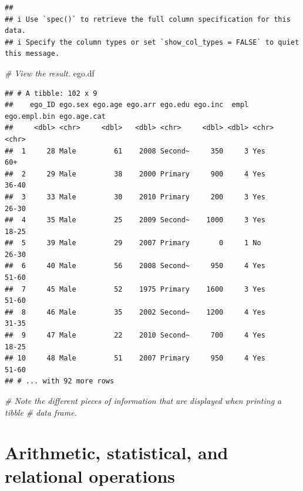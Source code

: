 \documentclass[
]{book}
\newenvironment{Shaded}{\begin{snugshade}}{\end{snugshade}}
\newcommand{\CommentTok}[1]{\textcolor[rgb]{0.56,0.35,0.01}{\textit{#1}}}
\newcommand{\NormalTok}[1]{#1}
\begin{document}
\begin{verbatim}
## 
## i Use `spec()` to retrieve the full column specification for this data.
## i Specify the column types or set `show_col_types = FALSE` to quiet this message.
\end{verbatim}

\begin{Shaded}
\begin{Highlighting}[]
\CommentTok{\# View the result.}
\NormalTok{ego.df}
\end{Highlighting}
\end{Shaded}

\begin{verbatim}
## # A tibble: 102 x 9
##    ego_ID ego.sex ego.age ego.arr ego.edu ego.inc  empl ego.empl.bin ego.age.cat
##     <dbl> <chr>     <dbl>   <dbl> <chr>     <dbl> <dbl> <chr>        <chr>      
##  1     28 Male         61    2008 Second~     350     3 Yes          60+        
##  2     29 Male         38    2000 Primary     900     4 Yes          36-40      
##  3     33 Male         30    2010 Primary     200     3 Yes          26-30      
##  4     35 Male         25    2009 Second~    1000     3 Yes          18-25      
##  5     39 Male         29    2007 Primary       0     1 No           26-30      
##  6     40 Male         56    2008 Second~     950     4 Yes          51-60      
##  7     45 Male         52    1975 Primary    1600     3 Yes          51-60      
##  8     46 Male         35    2002 Second~    1200     4 Yes          31-35      
##  9     47 Male         22    2010 Second~     700     4 Yes          18-25      
## 10     48 Male         51    2007 Primary     950     4 Yes          51-60      
## # ... with 92 more rows
\end{verbatim}

\begin{Shaded}
\begin{Highlighting}[]
\CommentTok{\# Note the different pieces of information that are displayed when printing a tibble}
\CommentTok{\# data frame.}
\end{Highlighting}
\end{Shaded}

\hypertarget{arithmetic-statistical-and-relational-operations}{%
\section{Arithmetic, statistical, and relational operations}\label{arithmetic-statistical-and-relational-operations}}
\end{document}

